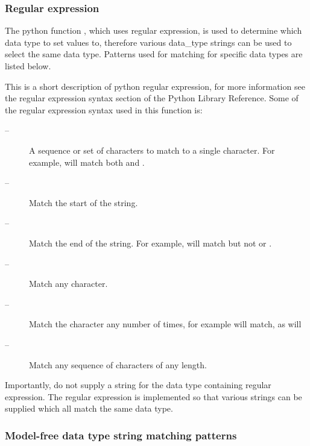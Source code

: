




\subsubsection{Regular expression}

The python function 
, which uses regular expression, is used to determine which data
type to set values to, therefore various data\_type strings can be used to select the same
data type.  Patterns used for matching for specific data types are listed below.

This is a short description of python regular expression, for more information see the
regular expression syntax section of the Python Library Reference.  Some of the regular
expression syntax used in this function is:

\begin{description}
\item[    
 --]   A sequence or set of characters to match to a single character.  For example, 
 will match both 
 and 
. 
\item[    
 --]   Match the start of the string. 
\item[    
 --]   Match the end of the string.  For example, 
 will match 
 but not 
 or 
. 
\item[    
 --]   Match any character. 
\item[    
 --]   Match the character 
 any number of times, for example 
 will match, as will 
 
\item[    
 --]   Match any sequence of characters of any length. 
\end{description}
Importantly, do not supply a string for the data type containing regular expression.  The
regular expression is implemented so that various strings can be supplied which all match
the same data type.


\subsubsection{Model-free data type string matching patterns}



